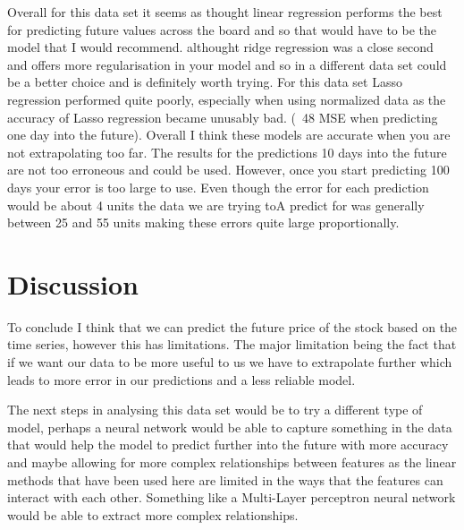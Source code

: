 \documentclass{report}
\begin{document}
Overall for this data set it seems as thought linear regression performs the best for predicting future values across the board and so that would have to be the model that I would recommend. althought ridge regression was a close second and offers more regularisation in your model and so in a different data set could be a better choice and is definitely worth trying.
For this data set Lasso regression performed quite poorly, especially when using normalized data as the accuracy of Lasso regression became unusably bad. (~48 MSE when predicting one day into the future).
Overall I think these models are accurate when you are not extrapolating too far. The results for the predictions 10 days into the future are not too erroneous and could be used. However, once you start predicting 100 days your error is too large to use. Even though the error for each prediction would be about 4 units the data we are trying toA predict for was generally between 25 and 55 units making these errors quite large proportionally.

\section{Discussion}

To conclude I think that we can predict the future price of the stock based on the time series, however this has limitations. The major limitation being the fact that if we want our data to be more useful to us we have to extrapolate further which leads to more error in our predictions and a less reliable model.

The next steps in analysing this data set would be to try a different type of model, perhaps a neural network would be able to capture something in the data that would help the model to predict further into the future with more accuracy and maybe allowing for more complex relationships between features as the linear methods that have been used here are limited in the ways that the features can interact with each other. Something like a Multi-Layer perceptron neural network would be able to extract more complex relationships.
\end{document}
